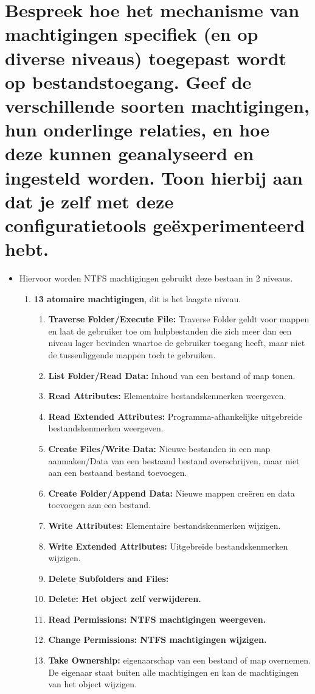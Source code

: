 \section{Bespreek hoe het mechanisme van machtigingen specifiek (en op diverse niveaus) toegepast wordt op bestandstoegang. Geef de verschillende soorten machtigingen, hun onderlinge relaties, en hoe deze kunnen geanalyseerd en ingesteld worden. Toon hierbij aan dat je zelf met deze configuratietools geëxperimenteerd hebt.}
\begin{itemize}
\item Hiervoor worden NTFS machtigingen gebruikt deze bestaan in 2 niveaus.
\begin{enumerate}
\item \textbf{13 atomaire machtigingen}, dit is het laagste niveau.
\begin{enumerate}
\item \textbf{Traverse Folder/Execute File:} Traverse Folder geldt voor mappen en laat de gebruiker toe om hulpbestanden die zich meer dan een niveau lager bevinden waartoe de gebruiker toegang heeft, maar niet de tussenliggende mappen toch te gebruiken.
\item \textbf{List Folder/Read Data:} Inhoud van een bestand of map tonen.
\item \textbf{Read Attributes:} Elementaire bestandskenmerken weergeven.
\item \textbf{Read Extended Attributes:} Programma-afhankelijke uitgebreide bestandskenmerken weergeven.
\item \textbf{Create Files/Write Data:} Nieuwe bestanden in een map aanmaken/Data van een bestaand bestand overschrijven, maar niet aan een bestaand bestand toevoegen.
\item \textbf{Create Folder/Append Data:} Nieuwe mappen creëren en data toevoegen aan een bestand.
\item \textbf{Write Attributes:} Elementaire bestandskenmerken wijzigen.
\item \textbf{Write Extended Attributes:} Uitgebreide bestandskenmerken wijzigen.
\item \textbf{Delete Subfolders and Files:}
\item \textbf{Delete: Het object zelf verwijderen.}
\item \textbf{Read Permissions: NTFS machtigingen weergeven.}
\item \textbf{Change Permissions: NTFS machtigingen wijzigen.}
\item \textbf{Take Ownership:} eigenaarschap van een bestand of map overnemen. De eigenaar staat buiten alle machtigingen en kan de machtigingen van het object wijzigen.
\end{enumerate}


\end{enumerate}
\end{itemize}
